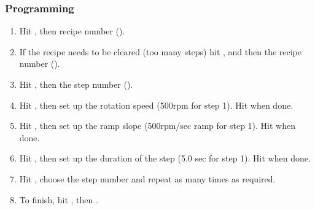 \subsubsection{Programming}
\begin{enumerate}
  \item Hit , then recipe number ().
  \item If the recipe needs to be cleared (too many steps) hit ,  and then the recipe number ().
  \item Hit , then the step number ().
  \item Hit , then set up the rotation speed (500rpm for step 1). Hit  when done.
  \item Hit , then set up the ramp slope (500rpm/sec ramp for step 1). Hit  when done.
  \item Hit , then set up the duration of the step (5.0 sec for step 1). Hit  when done.
  \item Hit , choose the step number and repeat as many times as required.
  \item To finish, hit , then .
\end{enumerate}

